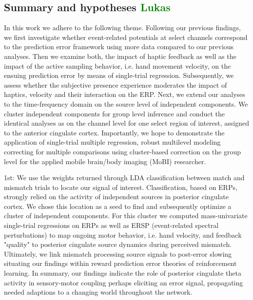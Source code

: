 \subsection{Summary and hypotheses \textcolor{green}{Lukas}}

In this work we adhere to the following theme. Following our previous findings, we first investigate whether event-related potentials at select channels correspond to the prediction error framework using more data compared to our previous analyses. Then we examine both, the impact of haptic feedback as well as the impact of the active sampling behavior, i.e. hand movement velocity, on the ensuing prediction error by means of single-trial regression. Subsequently, we assess whether the subjective presence experience moderates the impact of haptics, velocity and their interaction on the ERP. Next, we extend our analyses to the time-frequency domain on the source level of independent components. We cluster independent components for group level inference and conduct the identical analyses as on the channel level for one select region of interest, assigned to the anterior cingulate cortex. Importantly, we hope to demonstrate the application of single-trial multiple regression, robust multilevel modeling correcting for multiple comparisons using cluster-based correction on the group level for the applied mobile brain/body imaging (MoBI) researcher.

1st: We use the weights returned through LDA classification between match and mismatch trials to locate our signal of interest. Classification, based on ERPs, strongly relied on the activity of independent sources in posterior cingulate cortex. We chose this location as a seed to find and subsequently optimize a cluster of independent components. For this cluster we computed mass-univariate single-trial regressions on ERPs as well as ERSP (event-related spectral perturbations) to map ongoing motor behavior, i.e. hand velocity, and feedback "quality" to posterior cingulate source dynamics during perceived mismatch. Ultimately, we link mismatch processing source signals to post-error slowing situating our findings within reward prediction error theories of reinforcement learning. In summary, our findings indicate the role of posterior cingulate theta activity in sensory-motor coupling perhaps eliciting an error signal, propagating needed adaptions to a changing world throughout the network.

